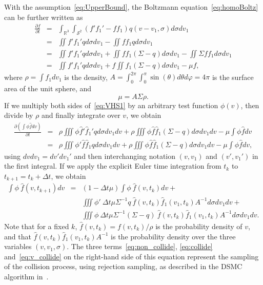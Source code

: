 \documentclass[12pt,nopreprintline]{elsarticle}
\newcommand{\bbR}{\mathbb R} \newcommand{\bbS}{\mathbb S}
\newcommand{\cS}{\mathcal S} \newcommand{\cT}{\mathcal T}
\newcommand{\Rthree}{{\bbR^3}}
\newcommand{\Stwo}{{\cS^2}}
\begin{document}
With the assumption~\eqref{eq:UpperBound}, the Boltzmann equation~\eqref{eq:homoBoltz} can be further written as
\begin{eqnarray}
    \frac{\partial f}{\partial t}   &= & \int_{\Rthree}\int_\Stwo \left(f'f_1' - f f_1\right)  q (v-v_1,\sigma) d\sigma dv_1 \nonumber \\
    & =& \iint f'f_1' q  d\sigma dv_1 - \iint ff_1 q  d\sigma dv_1\nonumber  \\
    & = & \iint f'f_1' q  d\sigma dv_1  + \iint ff_1 (\Sigma  - q)  d\sigma dv_1  - \iint \Sigma  ff_1 d\sigma dv_1 \nonumber\\
    &=& \iint f'f_1' q  d\sigma dv_1  + f \iint f_1 (\Sigma - q)  d\sigma dv_1  - \mu f,\label{eq:VHS1}
\end{eqnarray}
where $\rho = \int f_1 dv_1$ is the density, $A = \int_{0}^{2\pi}\int_{0}^{\pi} \sin(\theta) d\theta d\varphi = 4\pi$ is the surface area of the unit sphere, and 
\begin{equation} \label{eq:mu}
\mu = A \Sigma \rho.
\end{equation}
If we multiply both sides of~\eqref{eq:VHS1} by an arbitrary test function $\phi(v)$, then divide by $\rho$ and finally integrate over $v$, we obtain 
\begin{eqnarray*}
       \frac{\partial ( \int \phi \hat f dv)}{\partial t}  &= & \rho \iiint  \phi \hat f' \hat f_1' q  d\sigma dv_1 dv + \rho \iiint \phi \hat f \hat f_1 (\Sigma  - q)  d\sigma dv_1 dv -  \mu \int  \phi \hat f dv\\
       & = &\rho \iiint  \phi' \hat f \hat f_1 q  d\sigma dv_1 dv +\rho \iiint  \phi \hat f \hat f_1 (\Sigma  - q)  d\sigma dv_1 dv -  \mu \int  \phi \hat f dv,
\end{eqnarray*}
using $dv dv_1=dv'dv_1' $ and then interchanging notation $(v,v_1)$ and $(v',v_1')$ in the first integral.
If we apply the explicit Euler time integration from $t_k$ to $t_{k+1} = t_k + \Delta t$, we obtain
\begin{eqnarray}
     \int \phi\ \hat f (v,t_{k+1}) dv \label{eq:weakform}
       &=&   (1-\Delta t \mu ) \int \phi\ \hat f(v,t_{k}) dv + \label{eq:non_collide} \\
        &&  \iiint  \phi'  \ {\Delta t \mu \Sigma^{-1}  {q}} \  \hat f(v,t_{k})  \hat f_1(v_1,t_{k})   A^{-1} d\sigma dv_1 dv + \label{eq:collide} \\
       &&   \iiint \phi\ {\Delta t  \mu \Sigma^{-1} (\Sigma -q)} \  \hat f(v,t_{k})  \hat f_1(v_1,t_{k})  A^{-1} d\sigma dv_1 dv. \label{eq:v_collide}
\end{eqnarray}
Note that for a fixed $k$, $\hat f(v,t_k) =  f(v,t_k)  / \rho$ is the probability density of $v$, and that $ \hat f(v,t_k)  \hat f_1(v_1,t_k) A^{-1}$ is the probability density over the three variables $(v,v_1,\sigma)$. The three terms~\eqref{eq:non_collide}, \eqref{eq:collide} and~\eqref{eq:v_collide} on the right-hand side of this equation represent the sampling of the collision process, using rejection sampling, as described in the DSMC algorithm in~.
\end{document}
